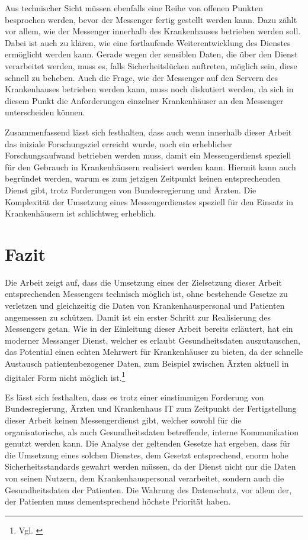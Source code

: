 Aus technischer Sicht müssen ebenfalls eine Reihe von offenen Punkten besprochen werden, bevor der Messenger fertig gestellt werden kann.
Dazu zählt vor allem, wie der Messenger innerhalb des Krankenhauses betrieben werden soll. Dabei ist auch zu klären, wie eine fortlaufende Weiterentwicklung des Dienstes ermöglicht werden kann. Gerade wegen der sensiblen Daten, die über den Dienst verarbeitet werden, muss es, falls Sicherheitslücken auftreten, möglich sein, diese schnell zu beheben. Auch die Frage, wie der Messenger auf den Servern des Krankenhauses betrieben werden kann, muss noch diskutiert werden, da sich in diesem Punkt die Anforderungen einzelner Krankenhäuser an den Messenger unterscheiden können.

Zusammenfassend lässt sich festhalten, dass auch wenn innerhalb dieser Arbeit das iniziale Forschungsziel erreicht wurde, noch ein erheblicher Forschungsaufwand betrieben werden muss, damit ein Messengerdienst speziell für den Gebrauch in Krankenhäusern realisiert werden kann. Hiermit kann auch begründet werden, warum es zum jetzigen Zeitpunkt keinen entsprechenden Dienst gibt, trotz Forderungen von Bundesregierung und Ärzten. Die Komplexität der Umsetzung eines Messengerdienstes speziell für den Einsatz in Krankenhäusern ist schlichtweg erheblich.

\section{Fazit}\label{chapter:fazit}
Die Arbeit zeigt auf, dass die Umsetzung eines der Zielsetzung dieser Arbeit entsprechenden Messengers technisch möglich ist, ohne bestehende Gesetze zu verletzen und gleichzeitig die Daten von Krankenhauspersonal und Patienten angemessen zu schützen.
Damit ist ein erster Schritt zur Realisierung des Messengers getan. Wie in der Einleitung dieser Arbeit bereits erläutert, hat ein moderner Messanger Dienst, welcher es erlaubt Gesundheitsdaten auszutauschen, das Potential einen echten Mehrwert für Krankenhäuser zu bieten, da der schnelle Austausch patientenbezogener Daten, zum Beispiel zwischen Ärzten aktuell in digitaler Form nicht möglich ist.\footnote{Vgl. \cite[S. 1292 f.]{G.Murphy2010}}

Es lässt sich festhalten, dass es trotz einer einstimmigen Forderung von Bundesregierung, Ärzten und Krankenhaus IT zum Zeitpunkt der Fertigstellung dieser Arbeit keinen Messengerdienst gibt, welcher sowohl für die organisatorische, als auch Gesundheitsdaten betreffende, interne Kommunikation genutzt werden kann. Die Analyse der geltenden Gesetze hat ergeben, dass für die Umsetzung eines solchen Dienstes, dem Gesetzt entsprechend, enorm hohe Sicherheitsstandards gewahrt werden müssen, da der Dienst nicht nur die Daten von seinen Nutzern, dem Krankenhauspersonal verarbeitet, sondern auch die Gesundheitsdaten der Patienten. Die Wahrung des Datenschutz, vor allem der, der Patienten muss dementsprechend höchste Priorität haben. 

